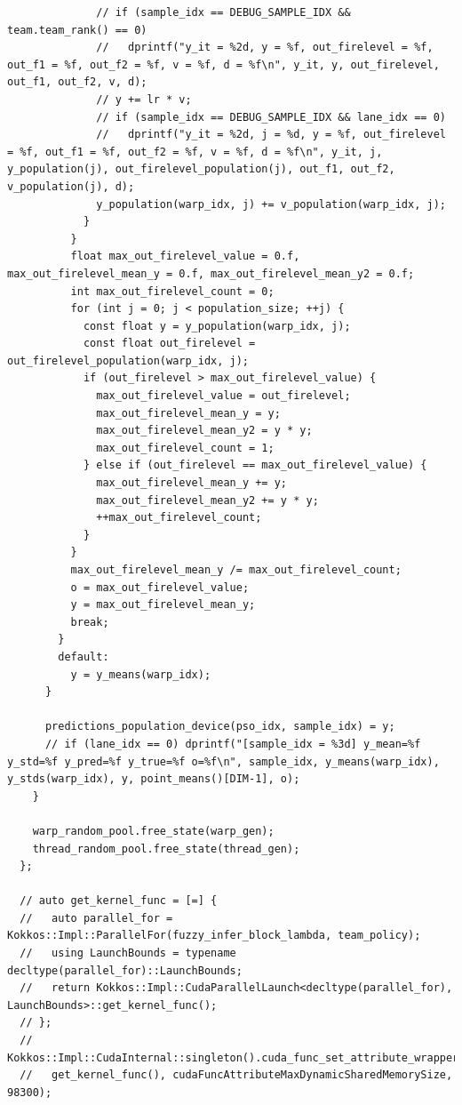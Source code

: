 \begin{verbatim}
              // if (sample_idx == DEBUG_SAMPLE_IDX && team.team_rank() == 0)
              //   dprintf("y_it = %2d, y = %f, out_firelevel = %f, out_f1 = %f, out_f2 = %f, v = %f, d = %f\n", y_it, y, out_firelevel, out_f1, out_f2, v, d);
              // y += lr * v;
              // if (sample_idx == DEBUG_SAMPLE_IDX && lane_idx == 0)
              //   dprintf("y_it = %2d, j = %d, y = %f, out_firelevel = %f, out_f1 = %f, out_f2 = %f, v = %f, d = %f\n", y_it, j, y_population(j), out_firelevel_population(j), out_f1, out_f2, v_population(j), d);
              y_population(warp_idx, j) += v_population(warp_idx, j);
            }
          }
          float max_out_firelevel_value = 0.f, max_out_firelevel_mean_y = 0.f, max_out_firelevel_mean_y2 = 0.f;
          int max_out_firelevel_count = 0;
          for (int j = 0; j < population_size; ++j) {
            const float y = y_population(warp_idx, j);
            const float out_firelevel = out_firelevel_population(warp_idx, j);
            if (out_firelevel > max_out_firelevel_value) {
              max_out_firelevel_value = out_firelevel;
              max_out_firelevel_mean_y = y;
              max_out_firelevel_mean_y2 = y * y;
              max_out_firelevel_count = 1;
            } else if (out_firelevel == max_out_firelevel_value) {
              max_out_firelevel_mean_y += y;
              max_out_firelevel_mean_y2 += y * y;
              ++max_out_firelevel_count;
            }
          }
          max_out_firelevel_mean_y /= max_out_firelevel_count;
          o = max_out_firelevel_value;
          y = max_out_firelevel_mean_y;
          break;
        }
        default:
          y = y_means(warp_idx);
      }

      predictions_population_device(pso_idx, sample_idx) = y;
      // if (lane_idx == 0) dprintf("[sample_idx = %3d] y_mean=%f y_std=%f y_pred=%f y_true=%f o=%f\n", sample_idx, y_means(warp_idx), y_stds(warp_idx), y, point_means()[DIM-1], o);
    }

    warp_random_pool.free_state(warp_gen);
    thread_random_pool.free_state(thread_gen);
  };

  // auto get_kernel_func = [=] {
  //   auto parallel_for = Kokkos::Impl::ParallelFor(fuzzy_infer_block_lambda, team_policy);
  //   using LaunchBounds = typename decltype(parallel_for)::LaunchBounds;
  //   return Kokkos::Impl::CudaParallelLaunch<decltype(parallel_for), LaunchBounds>::get_kernel_func();
  // };
  // Kokkos::Impl::CudaInternal::singleton().cuda_func_set_attribute_wrapper(
  //   get_kernel_func(), cudaFuncAttributeMaxDynamicSharedMemorySize, 98300);


\end{verbatim}
